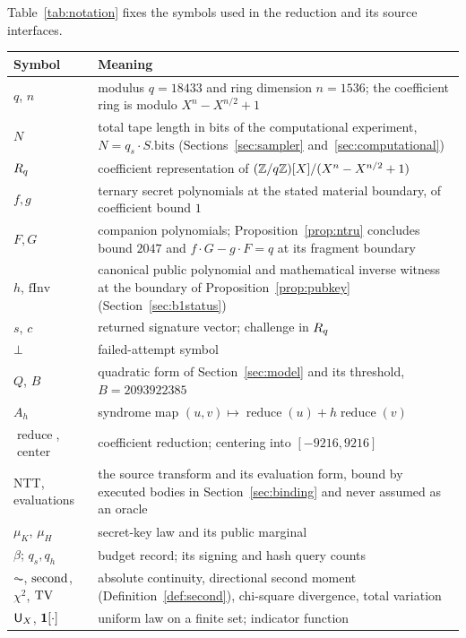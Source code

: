 Table~\ref{tab:notation} fixes the symbols used in the reduction and
its source interfaces.
\begin{table}[!htbp]
\centering\small
\begin{tabular}{@{}>{\raggedright\arraybackslash}p{}>{\raggedright\arraybackslash}p{}@{}}
\toprule
Symbol & Meaning \\
\midrule
$q$, $n$ & modulus $q=18433$ and ring dimension $n=1536$; the
 coefficient ring is modulo $X^{n}-X^{n/2}+1$ \\
$N$ & total tape length in bits of the computational experiment,
 $N=q_s\cdot S.\mathrm{bits}$ (Sections~\ref{sec:sampler}
 and~\ref{sec:computational}) \\
$R_q$ & coefficient representation of $(\mathbb{Z}/q\mathbb{Z})[X]/(X^n-X^{n/2}+1)$ \\
$f,g$ & ternary secret polynomials at the stated material boundary,
 of coefficient bound $1$ \\
$F,G$ & companion polynomials; Proposition~\ref{prop:ntru} concludes
 bound $2047$ and $f\cdot G-g\cdot F=q$ at its fragment boundary \\
$h$, $\mathrm{fInv}$ & canonical public polynomial and mathematical
 inverse witness at the boundary of Proposition~\ref{prop:pubkey}
 (Section~\ref{sec:b1status}) \\
$s$, $c$ & returned signature vector; challenge in $R_q$ \\
$\bot$ & failed-attempt symbol \\
$Q$, $B$ & quadratic form of Section~\ref{sec:model} and its threshold,
 $B=2093922385$ \\
$A_h$ & syndrome map $(u,v)\mapsto\operatorname{reduce}(u)
 +h\operatorname{reduce}(v)$ \\
$\operatorname{reduce}$, $\operatorname{center}$ & coefficient
 reduction; centering into $[-9216,9216]$ \\
NTT, evaluations & the source transform and its evaluation form, bound
 by executed bodies in Section~\ref{sec:binding} and never assumed as
 an oracle \\
$\mu_K$, $\mu_H$ & secret-key law and its public marginal \\
$\beta$; $q_s,q_h$ & budget record; its signing and hash query counts \\
$\AC$, $\operatorname{second}$, $\chi^2$, $\operatorname{TV}$ & absolute continuity, directional
 second moment (Definition~\ref{def:second}), chi-square divergence,
 total variation \\
$\mathsf{U}_X$, $\mathbf{1}[\cdot]$ & uniform law on a finite set; indicator function \\

\end{tabular}
\end{table}
